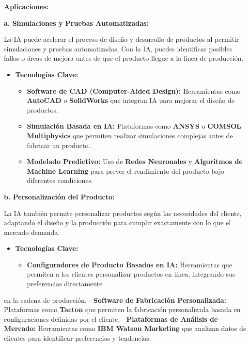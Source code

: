 \documentclass[
  10pt,
  letterpaper,
]{book}
\providecommand{\tightlist}{%
  \setlength{\itemsep}{0pt}\setlength{\parskip}{0pt}}\usepackage{longtable,booktabs,array}
\begin{document}
\textbf{Aplicaciones:}

\textbf{a. Simulaciones y Pruebas Automatizadas:}

La IA puede acelerar el proceso de diseño y desarrollo de productos al
permitir simulaciones y pruebas automatizadas. Con la IA, puedes
identificar posibles fallos o áreas de mejora antes de que el producto
llegue a la línea de producción.

\begin{itemize}
\tightlist
\item
  \textbf{Tecnologías Clave:}

  \begin{itemize}
  \tightlist
  \item
    \textbf{Software de CAD (Computer-Aided Design):} Herramientas como
    \textbf{AutoCAD} o \textbf{SolidWorks} que integran IA para mejorar
    el diseño de productos.
  \item
    \textbf{Simulación Basada en IA:} Plataformas como \textbf{ANSYS} o
    \textbf{COMSOL Multiphysics} que permiten realizar simulaciones
    complejas antes de fabricar un producto.
  \item
    \textbf{Modelado Predictivo:} Uso de \textbf{Redes Neuronales} y
    \textbf{Algoritmos de Machine Learning} para prever el rendimiento
    del producto bajo diferentes condiciones.
  \end{itemize}
\end{itemize}

\textbf{b. Personalización del Producto:}

La IA también permite personalizar productos según las necesidades del
cliente, adaptando el diseño y la producción para cumplir exactamente
con lo que el mercado demanda.

\begin{itemize}
\tightlist
\item
  \textbf{Tecnologías Clave:}

  \begin{itemize}
  \tightlist
  \item
    \textbf{Configuradores de Producto Basados en IA:} Herramientas que
    permiten a los clientes personalizar productos en línea, integrando
    sus preferencias directamente
  \end{itemize}
\end{itemize}

en la cadena de producción. - \textbf{Software de Fabricación
Personalizada:} Plataformas como \textbf{Tacton} que permiten la
fabricación personalizada basada en configuraciones definidas por el
cliente. - \textbf{Plataformas de Análisis de Mercado:} Herramientas
como \textbf{IBM Watson Marketing} que analizan datos de clientes para
identificar preferencias y tendencias.
\end{document}
